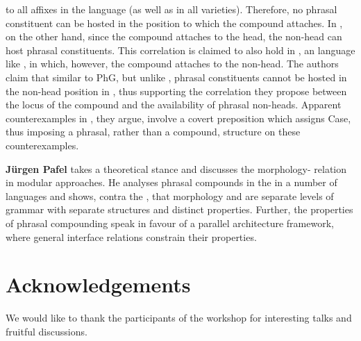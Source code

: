\documentclass[output=paper]{LSP/langsci}
\begin{document}
to all affixes in the language (as well as in all 
varieties). Therefore, no phrasal constituent can be hosted in the
position to which the compound  attaches. In , on the
other hand, since the compound  attaches to the head, the
non-head can host phrasal constituents. This correlation is claimed to
also hold in  , an  language like , in
which, however, the compound  attaches to the non-head. The
authors claim that similar to PhG, but unlike , phrasal
constituents cannot be hosted in the non-head position in ,
thus supporting the correlation they propose between the locus of the
compound  and the availability of phrasal non-heads. Apparent
counterexamples in , they argue, involve a covert preposition
which assigns  Case, thus imposing a phrasal, rather than a
compound, structure on these counterexamples.

\textbf{Jürgen Pafel} takes a theoretical stance and discusses the
morphology- relation in modular approaches. He analyses phrasal
compounds in the  in a number of languages and
shows, contra the , that morphology and
 are separate levels of grammar with separate structures and
distinct properties. Further, the properties of phrasal compounding
speak in favour of a parallel architecture framework, where general
interface relations constrain their properties. 



\section*{Acknowledgements}

We would like to thank the participants of the workshop for
interesting talks and fruitful discussions. 

\printbibliography[heading=subbibliography,notkeyword=this]
\end{document}
